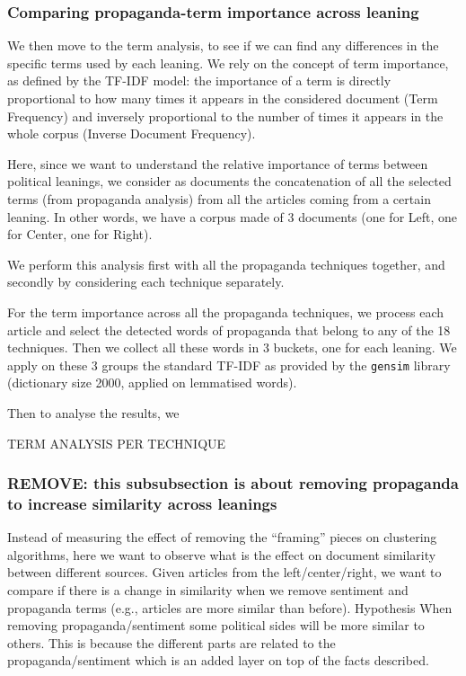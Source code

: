 \subsubsection{Comparing propaganda-term importance across leaning}
We then move to the term analysis, to see if we can find any differences in the specific terms used by each leaning.
We rely on the concept of term importance, as defined by the TF-IDF model: the importance of a term is directly proportional to how many times it appears in the considered document (Term Frequency) and inversely proportional to the number of times it appears in the whole corpus (Inverse Document Frequency).

Here, since we want to understand the relative importance of terms between political leanings, we consider as documents the concatenation of all the selected terms (from propaganda analysis) from all the articles coming from a certain leaning. In other words, we have a corpus made of 3 documents (one for Left, one for Center, one for Right).

We perform this analysis first with all the propaganda techniques together, and secondly by considering each technique separately.

For the term importance across all the propaganda techniques, we process each article and select the detected words of propaganda that belong to any of the 18 techniques. Then we collect all these words in 3 buckets, one for each leaning.
We apply on these 3 groups the standard TF-IDF as provided by the \texttt{gensim} library (dictionary size 2000, applied on lemmatised words).

Then to analyse the results, we


TERM ANALYSIS PER TECHNIQUE



\subsubsection{REMOVE: this subsubsection is about removing propaganda to increase similarity across leanings}
Instead of measuring the effect of removing the “framing” pieces on clustering algorithms, here we want to observe what is the effect on document similarity between different sources.
Given articles from the left/center/right, we want to compare if there is a change in similarity when we remove sentiment and propaganda terms (e.g., articles are more similar than before).
Hypothesis
When removing propaganda/sentiment some political sides will be more similar to others. This is because the different parts are related to the propaganda/sentiment which is an added layer on top of the facts described.

